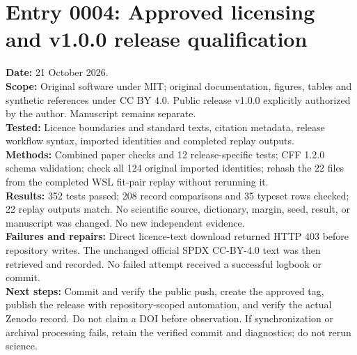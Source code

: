 \section*{Entry 0004: Approved licensing and v1.0.0 release qualification}
\textbf{Date:} 21 October 2026.\\
\textbf{Scope:} Original software under MIT; original documentation, figures,
tables and synthetic references under CC BY 4.0. Public release v1.0.0 explicitly
authorized by the author. Manuscript remains separate.\\
\textbf{Tested:} Licence boundaries and standard texts, citation metadata,
release workflow syntax, imported identities and completed replay outputs.\\
\textbf{Methods:} Combined paper checks and 12 release-specific tests;
CFF 1.2.0 schema validation; check all 124 original imported identities;
rehash the 22 files from the completed WSL fit-pair replay without rerunning it.\\
\textbf{Results:} 352 tests passed; 208 record comparisons and 35 typeset rows
checked; 22 replay outputs match. No scientific source, dictionary, margin,
seed, result, or manuscript was changed. No new independent evidence.\\
\textbf{Failures and repairs:} Direct licence-text download returned HTTP 403
before repository writes. The unchanged official SPDX CC-BY-4.0 text was then
retrieved and recorded. No failed attempt received a successful logbook or commit.\\
\textbf{Next steps:} Commit and verify the public push, create the approved tag,
publish the release with repository-scoped automation, and verify the actual
Zenodo record. Do not claim a DOI before observation. If synchronization or archival
processing fails, retain the verified commit and diagnostics; do not rerun science.
